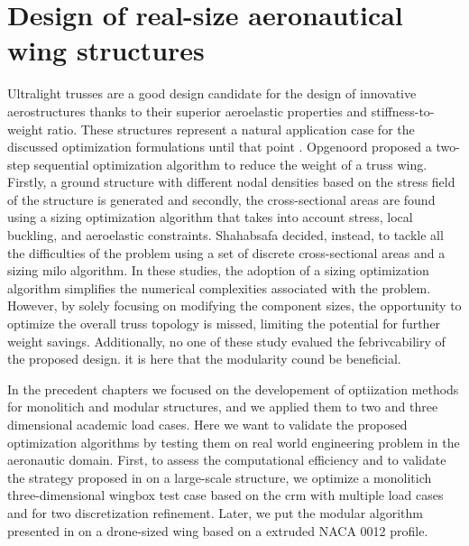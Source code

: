 \setchapterpreamble[u]{\margintoc}
\glsresetall %

\chapter{Design of real-size aeronautical wing structures} \label{chap:07}

Ultralight trusses are a good design candidate for the design of innovative aerostructures thanks to their superior aeroelastic properties and stiffness-to-weight ratio. These structures represent a natural application case for the discussed optimization formulations until that point . Opgenoord  proposed a two-step sequential optimization algorithm to reduce the weight of a truss wing. Firstly, a ground structure with different nodal densities based on the stress field of the structure is generated and secondly, the cross-sectional areas are found using a sizing optimization algorithm that takes into account stress, local buckling, and aeroelastic constraints. Shahabsafa  decided, instead, to tackle all the difficulties of the problem using a set of discrete cross-sectional areas and a sizing \gls{milo} algorithm. In these studies, the adoption of a sizing optimization algorithm simplifies the numerical complexities associated with the problem. However, by solely focusing on modifying the component sizes, the opportunity to optimize the overall truss topology is missed, limiting the potential for further weight savings. Additionally, no one of these study evalued the febrivcabiliry of the proposed design. it is here that the modularity cound be beneficial.

In the precedent chapters we focused on the developement of optiization methods for monolitich and modular structures, and we applied them to two and three dimensional academic load cases. Here we want to validate the proposed optimization algorithms by testing them on real world engineering problem in the aeronautic domain. First, to assess the computational efficiency and to validate the strategy proposed in  on a large-scale structure, we optimize a monolitich three-dimensional wingbox test case based on the \acrfull{crm} with multiple load cases and for two discretization refinement. Later, we put the modular algorithm presented in  on a drone-sized wing based on a extruded NACA 0012 profile.

